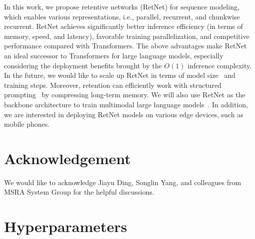 \documentclass{article}
\newcommand\our{RetNet}
\begin{document}
In this work, we propose retentive networks (\our{}) for sequence modeling, which enables various representations, i.e., parallel, recurrent, and chunkwise recurrent.
\our{} achieves significantly better inference efficiency (in terms of memory, speed, and latency), favorable training parallelization, and competitive performance compared with Transformers.
The above advantages make \our{} an ideal successor to Transformers for large language models, especially considering the deployment benefits brought by the $O(1)$ inference complexity.
In the future, we would like to scale up \our{} in terms of model size~\cite{xmoe} and training steps.
Moreover, retention can efficiently work with structured prompting~\cite{structured:prompt} by compressing long-term memory.
We will also use \our{} as the backbone architecture to train multimodal large language models~\cite{metalm,kosmos-1,kosmos-2}.
In addition, we are interested in deploying \our{} models on various edge devices, such as mobile phones.


\section*{Acknowledgement}

We would like to acknowledge Jiayu Ding, Songlin Yang, and colleagues from MSRA System Group for the helpful discussions. 


\nocite{s4}
\nocite{ResurrectingRNN}
\nocite{rwkv}




\newpage
\appendix

\section{Hyperparameters}
\label{app:hp}
\end{document}
